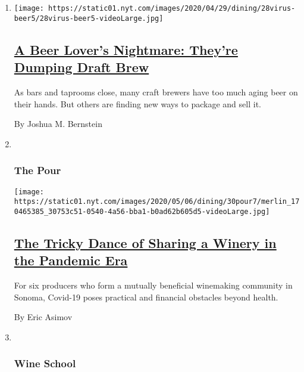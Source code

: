 \begin{enumerate}
\def\labelenumi{\arabic{enumi}.}
\item
  \texttt{[image: https://static01.nyt.com/images/2020/04/29/dining/28virus-beer5/28virus-beer5-videoLarge.jpg]}

  \hypertarget{a-beer-lovers-nightmare-theyre-dumping-draft-brew}{%
  \subsection{\texorpdfstring{\href{/2020/04/28/dining/drinks/craft-beer-coronavirus.html}{A
  Beer Lover's Nightmare: They're Dumping Draft
  Brew}}{A Beer Lover's Nightmare: They're Dumping Draft Brew}}\label{a-beer-lovers-nightmare-theyre-dumping-draft-brew}}

  As bars and taprooms close, many craft brewers have too much aging
  beer on their hands. But others are finding new ways to package and
  sell it.

  By Joshua M. Bernstein
\item ~
  \hypertarget{the-pour-1}{%
  \subsubsection{The Pour}\label{the-pour-1}}

  \texttt{[image: https://static01.nyt.com/images/2020/05/06/dining/30pour7/merlin\_170465385\_30753c51-0540-4a56-bba1-b0ad62b605d5-videoLarge.jpg]}

  \hypertarget{the-tricky-dance-of-sharing-a-winery-in-the-pandemic-era}{%
  \subsection{\texorpdfstring{\href{/2020/04/30/dining/drinks/pax-mahle-wine-coronavirus.html}{The
  Tricky Dance of Sharing a Winery in the Pandemic
  Era}}{The Tricky Dance of Sharing a Winery in the Pandemic Era}}\label{the-tricky-dance-of-sharing-a-winery-in-the-pandemic-era}}

  For six producers who form a mutually beneficial winemaking community
  in Sonoma, Covid-19 poses practical and financial obstacles beyond
  health.

  By Eric Asimov
\item ~
  \hypertarget{wine-school-1}{%
  \subsubsection{Wine School}\label{wine-school-1}}


\end{enumerate}
